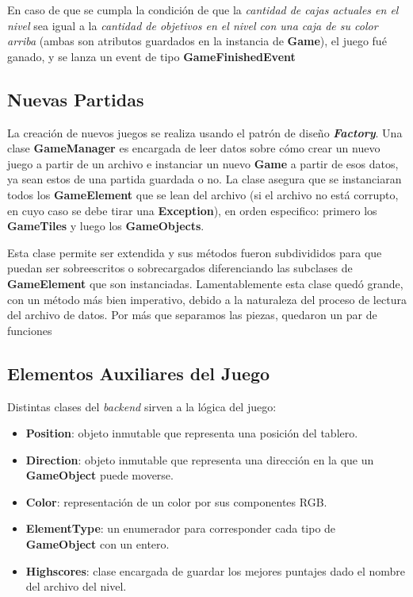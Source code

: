 \documentclass[a4paper,12pt,titlepage]{article}
\begin{document}
En caso de que se cumpla la condición de que la \emph{cantidad de cajas actuales en el nivel} sea igual a la \emph{cantidad de objetivos en el nivel con una caja de su color arriba} (ambas son atributos guardados en la instancia de \textbf{Game}), el juego fué ganado, y se lanza un event de tipo \textbf{GameFinishedEvent}

\subsection{Nuevas Partidas}

La creación de nuevos juegos se realiza usando el patrón de diseño \textbf{\emph{Factory}}. Una clase \textbf{GameManager} es encargada de leer datos sobre cómo crear un nuevo juego a partir de un archivo e instanciar un nuevo \textbf{Game} a partir de esos datos, ya sean estos de una partida guardada o no. La clase asegura que se instanciaran todos los \textbf{GameElement} que se lean del archivo (si el archivo no está corrupto, en cuyo caso se debe tirar una \textbf{Exception}), en orden especifico: primero los \textbf{GameTiles} y luego los \textbf{GameObjects}.

Esta clase permite ser extendida y sus métodos fueron subdivididos para que puedan ser sobreescritos o sobrecargados diferenciando las subclases de \textbf{GameElement} que son instanciadas. Lamentablemente esta clase quedó grande, con un método más bien imperativo, debido a la naturaleza del proceso de lectura del archivo de datos. Por más que separamos las piezas, quedaron un par de funciones 	

\subsection{Elementos Auxiliares del Juego}

Distintas clases del \emph{backend} sirven a la lógica del juego:

\begin{itemize}
    \item \textbf{Position}: objeto inmutable que representa una posición del tablero.
    \item \textbf{Direction}: objeto inmutable que representa una dirección en la que un \textbf{GameObject} puede moverse.
    \item \textbf{Color}: representación de un color por sus componentes RGB.
    \item \textbf{ElementType}: un enumerador para corresponder cada tipo de \textbf{GameObject} con un entero.
	\item \textbf{Highscores}: clase encargada de guardar los mejores puntajes dado el nombre del archivo del nivel.
\end{itemize}
\end{document}
